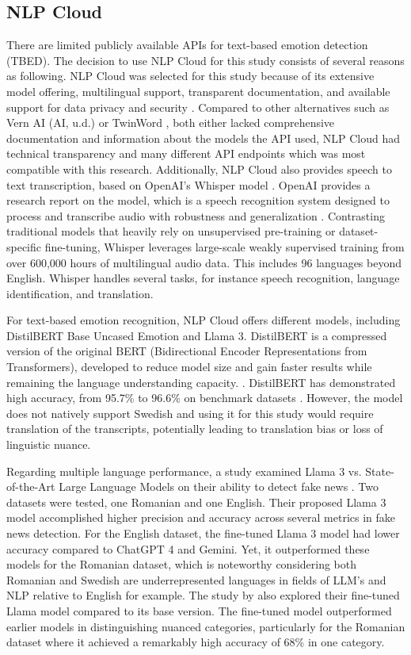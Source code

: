 \subsection{NLP Cloud}
\label{sec:theo-nlp-cloud}

There are limited publicly available APIs for text-based emotion detection (TBED). The decision to use NLP Cloud for this study consists of several reasons as following. NLP Cloud was selected for this study because of its extensive model offering, multilingual support, transparent documentation, and available support for data privacy and security \autocite{NLPCloud}.  Compared to other alternatives such as Vern AI (AI, u.d.) or TwinWord \autocite{TwinWord}, both either lacked comprehensive documentation and information about the models the API used, NLP Cloud had technical transparency and many different API endpoints which was most compatible with this research. 
Additionally, NLP Cloud also provides speech to text transcription, based on OpenAI’s Whisper model \autocite{NLPCloud}. OpenAI provides a research report on the model, which is a speech recognition system designed to process and transcribe audio with robustness and generalization \autocite{Radford2022}. Contrasting traditional models that heavily rely on unsupervised pre-training or dataset-specific fine-tuning, Whisper leverages large-scale weakly supervised training from over 600,000 hours of multilingual audio data. This includes 96 languages beyond English. Whisper handles several tasks, for instance speech recognition, language identification, and translation.  

\medskip
For text-based emotion recognition, NLP Cloud offers different models, including DistilBERT Base Uncased Emotion and Llama 3. DistilBERT is a compressed version of the original BERT (Bidirectional Encoder Representations from Transformers), developed to reduce model size and gain faster results while remaining the language understanding capacity. \autocite {Qazi2025}. DistilBERT has demonstrated high accuracy, from 95.7\% to 96.6\% on benchmark datasets \autocite{Areshey2024}. However, the model does not natively support Swedish and using it for this study would require translation of the transcripts, potentially leading to translation bias or loss of linguistic nuance. 

Regarding multiple language performance, a study examined Llama 3 vs. State-of-the-Art Large Language Models on their ability to detect fake news \autocite{Repede2024}. Two datasets were tested, one Romanian and one English. Their proposed Llama 3 model accomplished higher precision and accuracy across several metrics in fake news detection. For the English dataset, the fine-tuned Llama 3 model had lower accuracy compared to ChatGPT 4 and Gemini. Yet, it outperformed these models for the Romanian dataset, which is noteworthy considering both Romanian and Swedish are underrepresented languages in fields of LLM’s and NLP relative to English for example. The study by \textcite{Repede2024} also explored their fine-tuned Llama model compared to its base version. The fine-tuned model outperformed earlier models in distinguishing nuanced categories, particularly for the Romanian dataset where it achieved a remarkably high accuracy of 68\% in one category. 

